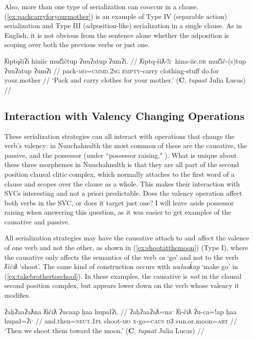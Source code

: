 Also, more than one type of serialization can cooccur in a clause. (\ref{ex:packcarryforyourmother}) is an example of Type IV (separable action) serialization and Type III (adposition-like) serialization in a single clause. As in English, it is not obvious from the sentence alone whether the adposition is scoping over both the previous verbs or just one.

\ex \label{ex:packcarryforyourmother}
\begingl
\glpreamble ƛ̓iptqšiʔi hiniic muč̓ičtup ʔuuʔatup ʔumʔi. //
\gla ƛ̓iptq-šiƛ-!iˑ hina-iic.\textsc{dr} muč̓ič-(s)tup ʔuuʔatup ʔumʔi //
\glb pack-\textsc{mo}=\textsc{cmmd.2sg} \textsc{empty}-carry clothing-stuff do.for your.mother //
\glft `Pack and carry clothes for your mother.' (\textbf{C}, \textit{tupaat} Julia Lucas) //
\endgl
\xe

\subsection{Interaction with Valency Changing Operations} \label{ch:sv:valence}

These serialization strategies can all interact with operations that change the verb's valency: in Nuuchahnulth the most common of these are the causative, the passive, and the possessor (under ``possessor raising," \citealt{braithwaite2003}). What is unique about these three morphemes in Nuuchahnulth is that they are all part of the second position clausal clitic complex, which normally attaches to the first word of a clause and scopes over the clause as a whole. This makes their interaction with SVCs interesting and not a priori predictable. Does the valency operation affect both verbs in the SVC, or does it target just one? I will leave aside possessor raising when answering this question, as it was easier to get examples of the causative and passive.

All serialization strategies may have the causative attach to and affect the valence of one verb and not the other, as shown in (\ref{ex:shootatthemoon}) (Type I), where the causative only affects the semantics of the verb \textit{ca} `go' and not to the verb \textit{ƛ̓ičiƛ} `shoot'. The same kind of construction occurs with \textit{wałaak̓ap} `make go' in (\ref{ex:takebrothertoschool}). In these examples, the causative is \textit{not} in the clausal second position complex, but appears lower down on the verb whose valency it modifies.

\ex \label{ex:shootatthemoon}
\begingl
\glpreamble ʔaḥʔaaʔaƛna ƛ̓ičiƛ ʔucaap ḥaa hupałʔi. //
\gla ʔaḥʔaaʔaƛ=naˑ ƛ̓i-čiƛ ʔu-ca=!ap ḥaa hupał=ʔiˑ //
\glb and.then=\textsc{neut.1pl} shoot-\textsc{mo} \textsc{x}-go=\textsc{caus} \textsc{d3} sun.or.moon=\textsc{art} //
\glft `Then we shoot them toward the moon.' (\textbf{C}, \textit{tupaat} Julia Lucas) //
\endgl
\xe

